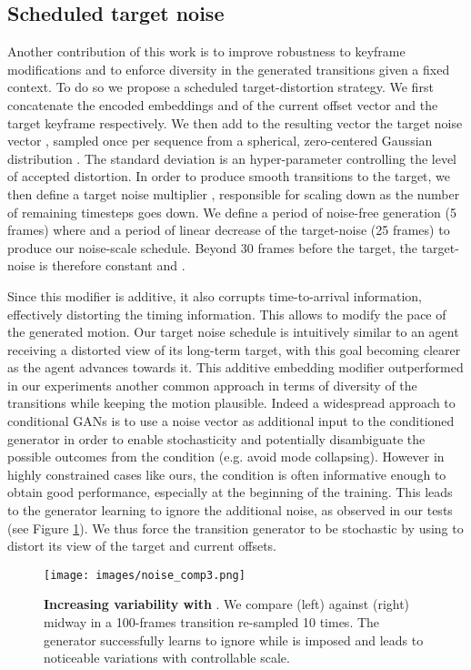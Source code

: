 \documentclass[acmtog]{acmart}
\begin{document}
\subsection{Scheduled target noise}\label{sec:targetnoise}
Another contribution of this work is to improve robustness to keyframe modifications and to enforce diversity in the generated transitions given a fixed context. To do so we propose a scheduled target-distortion strategy.  We first concatenate the encoded embeddings  and  of the current offset vector and the target keyframe respectively. We then add to the resulting vector the target noise vector , sampled once per sequence from a spherical, zero-centered Gaussian distribution . The standard deviation  is an hyper-parameter controlling the level of accepted distortion. In order to produce smooth transitions to the target, we then define a target noise multiplier , responsible for scaling down  as the number of remaining timesteps goes down. We define a period of noise-free generation (5 frames) where  and a period of linear decrease of the target-noise (25 frames) to produce our noise-scale schedule. Beyond 30 frames before the target, the target-noise is therefore constant and . 

Since this modifier is additive, it also corrupts time-to-arrival information, effectively distorting the timing information. This allows to modify the pace of the generated motion. Our target noise schedule is intuitively similar to an agent receiving a distorted view of its long-term target, with this goal becoming clearer as the agent advances towards it. This additive embedding modifier outperformed in our experiments another common approach in terms of diversity of the transitions while keeping the motion plausible. Indeed a widespread approach to conditional GANs is to use a noise vector  as additional input to the conditioned generator in order to enable stochasticity and potentially disambiguate the possible outcomes from the condition (e.g. avoid mode collapsing). However in highly constrained cases like ours, the condition is often informative enough to obtain good performance, especially at the beginning of the training. This leads to the generator learning to ignore the additional noise, as observed in our tests (see Figure \ref{fig:noisecomp}). We thus force the transition generator to be stochastic by using  to distort its view of the target and current offsets. 
\begin{figure}[h]
\begin{center}
\centerline{\texttt{[image: images/noise\_comp3.png]}}
  \caption{\textbf{Increasing variability with }. We compare  (left) against  (right) midway in a 100-frames transition re-sampled 10 times. The generator successfully learns to ignore  while  is imposed and leads to noticeable variations with controllable scale.}
  \label{fig:noisecomp}
\end{center}
\vspace{-0.5cm}
\end{figure}
\end{document}
